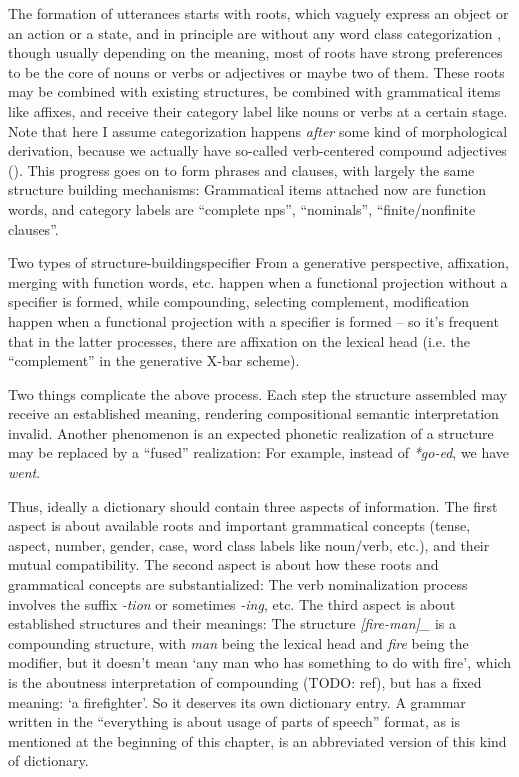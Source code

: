 \documentclass[UTF8, a4paper, oneside, scheme=plain]{ctexrep}
\newcommand*{\citepage}[1]{pp.~{#1}}
\newcommand{\corpus}[1]{\emph{#1}}
\newcommand{\translate}[1]{`#1'}
\begin{document}
The formation of utterances starts with roots, 
which vaguely express an object or an action or a state,
and in principle are without any word class categorization 
\citep[\citepage{13}]{greenough2013allen},
though usually depending on the meaning,
most of roots have strong preferences to be the core of nouns or verbs or adjectives or maybe two of them.
These roots may be combined with existing structures,
be combined with grammatical items like affixes,
and receive their category label like nouns or verbs at a certain stage.
Note that here I assume categorization happens \emph{after} some kind of morphological derivation,
because we actually have so-called verb-centered compound adjectives
().
This progress goes on to form phrases and clauses,
with largely the same structure building mechanisms:
Grammatical items attached now are function words,
and category labels are ``complete \acs{np}s'', ``nominals'', ``finite/nonfinite clauses''.

\begin{theorybox}{Two types of structure-building}{specifier}
    From a generative perspective, 
    affixation, merging with function words, etc. 
    happen when a functional projection without a specifier is formed,
    while compounding, selecting complement, modification 
    happen when a functional projection with a specifier is formed
    -- so it's frequent that in the latter processes,
    there are affixation on the lexical head (i.e. the ``complement'' in the generative X-bar scheme).
\end{theorybox}

Two things complicate the above process. 
Each step the structure assembled may receive an established meaning,
rendering compositional semantic interpretation invalid.
Another phenomenon is 
an expected phonetic realization of a structure 
may be replaced by a ``fused'' realization:
For example, instead of \corpus{*go-ed}, we have \corpus{went}.

Thus, ideally a dictionary should contain three aspects of information.
The first aspect is about available roots and important grammatical concepts
(tense, aspect, number, gender, case, word class labels like noun/verb, etc.),
and their mutual compatibility.
The second aspect is about how these roots and grammatical concepts are substantialized:
The verb nominalization process involves the suffix \corpus{-tion} or sometimes \corpus{-ing}, etc.
The third aspect is about established structures and their meanings:
The structure \corpus{[fire-man]_{}} 
is a compounding structure,
with \corpus{man} being the lexical head and \corpus{fire} being the modifier,
but it doesn't mean \translate{any man who has something to do with fire},
which is the aboutness interpretation of compounding (TODO: ref),
but has a fixed meaning: \translate{a firefighter}.
So it deserves its own dictionary entry.
A grammar written in the ``everything is about usage of parts of speech'' format, 
as is mentioned at the beginning of this chapter,
is an abbreviated version of this kind of dictionary.
\end{document}
